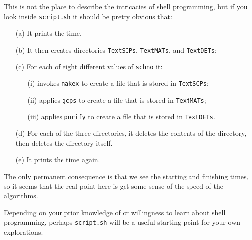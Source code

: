 \documentclass[12pt]{article}
\theoremstyle{definition}
\begin{document}
This is not the place to describe the intricacies of shell
programming, but if you look inside \texttt{script.sh} it should be
pretty obvious that:
\begin{enumerate}
  \item[(a)] It prints the time.
  \item[(b)] It then creates directories \texttt{TextSCPs}.
    \texttt{TextMATs}, and \texttt{TextDETs};
  \item[(c)] For each of eight different values of \texttt{schno} it:
    \begin{enumerate}
      \item[(i)] invokes \texttt{makex} to create a file that is stored in \texttt{TextSCPs};
      \item[(ii)] applies \texttt{gcps} to create a file that is stored in \texttt{TextMATs};
      \item[(iii)] applies \texttt{purify} to create a file that is stored in \texttt{TextDETs}.
    \end{enumerate}
  \item[(d)] For each of the three directories, it deletes the
    contents of the directory, then deletes the directory itself.
  \item[(e)] It prints the time again.
\end{enumerate}
The only permanent consequence is that we see the starting and
finishing times, so it seems that the real point here is get some sense of
the speed of the algorithms.

Depending on your prior knowledge of or willingness to learn about
shell programming, perhaps \texttt{script.sh} will be a useful
starting point for your own explorations.


\end{document}
